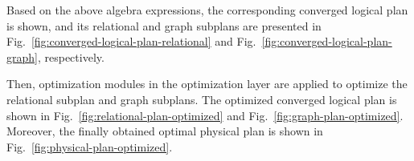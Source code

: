 \begin{example}
    Based on the above algebra expressions, the corresponding converged logical plan is shown, and its relational and graph subplans are presented in Fig.~\ref{fig:converged-logical-plan-relational} and Fig.~\ref{fig:converged-logical-plan-graph}, respectively.
    
    Then, optimization modules in the optimization layer are applied to optimize the relational subplan and graph subplans.
    The optimized converged logical plan is shown in Fig.~\ref{fig:relational-plan-optimized} and Fig.~\ref{fig:graph-plan-optimized}.
    Moreover, the finally obtained optimal physical plan is shown in Fig.~\ref{fig:physical-plan-optimized}.
\end{example}

